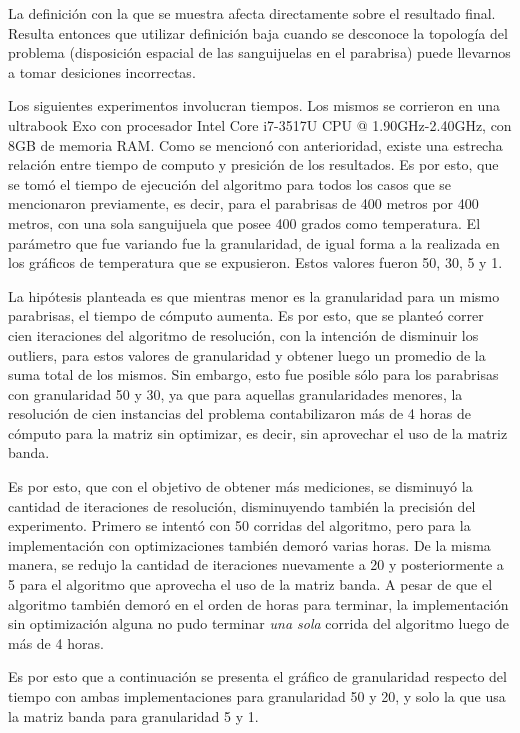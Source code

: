 	La definición con la que se muestra afecta directamente sobre el resultado final. Resulta entonces que utilizar definición baja cuando se desconoce la topología del problema (disposición espacial de las sanguijuelas en el parabrisa) puede llevarnos a tomar desiciones incorrectas.

\newpage
	

\par 
	Los siguientes experimentos involucran tiempos. Los mismos se corrieron en una ultrabook Exo con procesador Intel Core i7-3517U CPU @ 1.90GHz-2.40GHz, con 8GB de memoria RAM.  
	Como se mencionó con anterioridad, existe una estrecha relación entre tiempo de computo y presición de los resultados. Es por esto, que se tomó el tiempo de ejecución del algoritmo para todos los casos que se mencionaron previamente, es decir, para el parabrisas de 400 metros por 400 metros, con una sola sanguijuela que posee 400 grados como temperatura. El parámetro que fue variando fue la granularidad, de igual forma a la realizada en los gráficos de temperatura que se expusieron. Estos valores fueron 50, 30, 5 y 1. 
	\par 
	La hipótesis planteada es que mientras menor es la granularidad para un mismo parabrisas, el tiempo de cómputo aumenta. Es por esto, que se planteó correr cien iteraciones del algoritmo de resolución, con la intención de disminuir los outliers, para estos valores de granularidad  y obtener luego un promedio de la suma total de los mismos. Sin embargo, esto fue posible sólo para los parabrisas con granularidad 50 y 30, ya que para aquellas granularidades menores, la resolución de cien instancias del problema contabilizaron más de 4 horas de cómputo para la matriz sin optimizar, es decir, sin aprovechar el uso de la matriz banda.
	\par 
	Es por esto, que con el objetivo de obtener más mediciones, se disminuyó la cantidad de iteraciones de resolución, disminuyendo también la precisión del experimento. Primero se intentó con 50 corridas del algoritmo, pero para la implementación con optimizaciones también demoró varias horas. De la misma manera, se redujo la cantidad de iteraciones nuevamente a 20 y posteriormente a 5 para el algoritmo que aprovecha el uso de la matriz banda. A pesar de que el algoritmo también demoró en el orden de horas para terminar, la implementación sin optimización alguna no pudo terminar \textit{una sola} corrida del algoritmo luego de más de 4 horas. 
	\par 
	Es por esto que a continuación se presenta el gráfico de granularidad respecto del tiempo con ambas implementaciones para granularidad 50 y 20, y solo la que usa la matriz banda para granularidad 5 y 1.
